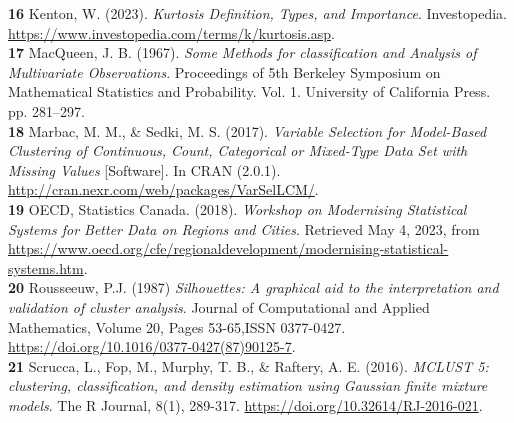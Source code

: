 \documentclass[11pt, a4paper]{article}
\begin{document}
\noindent\textbf{16} Kenton, W. (2023). \textit{Kurtosis Definition, Types, and Importance}. Investopedia. \sloppy\url{https://www.investopedia.com/terms/k/kurtosis.asp}. \\

\noindent\textbf{17} MacQueen, J. B. (1967). \textit{Some Methods for classification and Analysis of Multivariate Observations}. Proceedings of 5th Berkeley Symposium on Mathematical Statistics and Probability. Vol. 1. University of California Press. pp. 281–297. \\

\noindent\textbf{18} Marbac, M. M., \& Sedki, M. S. (2017). \textit{Variable Selection for Model-Based Clustering of Continuous, Count, Categorical or Mixed-Type Data Set with Missing Values} [Software]. In CRAN (2.0.1). \sloppy\url{ http://cran.nexr.com/web/packages/VarSelLCM/}. \\


\noindent\textbf{19} OECD, Statistics Canada. (2018). \textit{Workshop on Modernising Statistical Systems for Better Data on Regions and Cities}.  Retrieved May 4, 2023, from \sloppy\url{https://www.oecd.org/cfe/regionaldevelopment/modernising-statistical-systems.htm}. \\


\noindent\textbf{20} Rousseeuw, P.J. (1987) \textit{Silhouettes: A graphical aid to the interpretation and validation of cluster analysis}. Journal of Computational and Applied Mathematics, Volume 20, Pages 53-65,ISSN 0377-0427. \sloppy\url{https://doi.org/10.1016/0377-0427(87)90125-7}. \\

\noindent\textbf{21} Scrucca, L., Fop, M., Murphy, T. B., \& Raftery, A. E. (2016). \textit{MCLUST 5: clustering, classification, and density estimation using Gaussian finite mixture models}. The R Journal, 8(1), 289-317.  \sloppy\url{https://doi.org/10.32614/RJ-2016-021}. \\
\end{document}
